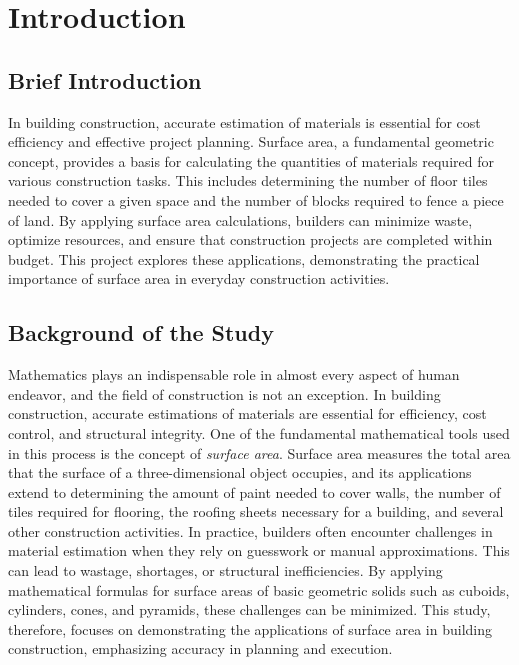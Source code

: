 \documentclass[12pt,a4paper,openany,titlepage,reqno, final]{report}
\theoremstyle{definition}
\begin{document}
	

	
	\renewcommand\contentsname{TABLE OF CONTENTS}
	\tableofcontents
	\clearpage
	
	\chapter{Introduction}
	
	\section{Brief Introduction}
	\noindent In building construction, accurate estimation of materials is essential for cost efficiency and effective project planning. Surface area, a fundamental geometric concept, provides a basis for calculating the quantities of materials required for various construction tasks. This includes determining the number of floor tiles needed to cover a given space and the number of blocks required to fence a piece of land. By applying surface area calculations, builders can minimize waste, optimize resources, and ensure that construction projects are completed within budget. This project explores these applications, demonstrating the practical importance of surface area in everyday construction activities.
	
	
	\section{Background of the Study}
\noindent Mathematics plays an indispensable role in almost every aspect of human endeavor, and the field of construction is not an exception. In building construction, accurate estimations of materials are essential for efficiency, cost control, and structural integrity. One of the fundamental mathematical tools used in this process is the concept of \textit{surface area}. Surface area measures the total area that the surface of a three-dimensional object occupies, and its applications extend to determining the amount of paint needed to cover walls, the number of tiles required for flooring, the roofing sheets necessary for a building, and several other construction activities. In practice, builders often encounter challenges in material estimation when they rely on guesswork or manual approximations. This can lead to wastage, shortages, or structural inefficiencies. By applying mathematical formulas for surface areas of basic geometric solids such as cuboids, cylinders, cones, and pyramids, these challenges can be minimized. This study, therefore, focuses on demonstrating the applications of surface area in building construction, emphasizing accuracy in planning and execution.
\end{document}
